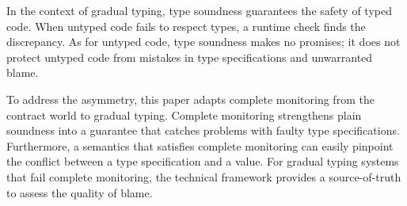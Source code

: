 In the context of gradual typing, type soundness guarantees the safety of typed
code. When untyped code fails to respect types, a runtime check finds the
discrepancy. As for untyped code, type soundness makes no promises; it
does not protect untyped code from mistakes in type specifications and
unwarranted blame.

To address the asymmetry, this paper adapts complete monitoring from the
contract world to gradual typing. Complete monitoring strengthens plain
soundness into a guarantee that catches problems with faulty type
specifications. Furthermore, a semantics that satisfies complete monitoring can
easily pinpoint the conflict between a type specification and a value. For
gradual typing systems that fail complete monitoring, the technical framework
provides a source-of-truth to assess the quality of blame.
